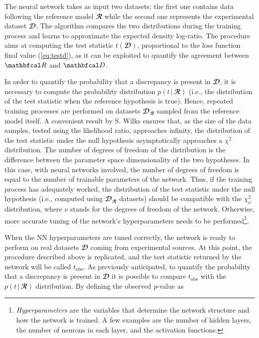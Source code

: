 The neural network takes as input two datasets: the first one contains data following the reference model
$\mathbfcal{R}$ while the second one represents the experimental dataset $\mathbfcal{D}$. The algorithm compares the two
distributions during the training process and learns to approximate the expected density log-ratio. The procedure aims
at computing the test statistic $t(\mathbfcal{D})$, proportional to the loss function final value (\autoref{eq:testd}),
as it can be exploited to quantify the agreement between $\R$ and $\D$. 

\begin{figure}[h]
	\centering
	
	\label{fig:summary}
\end{figure} 

In order to quantify the probability that a discrepancy is present in $\mathbfcal{D}$, it is necessary to compute the
probability distribution $p(t\,|\,\mathbfcal{R})$ (i.e., the distribution of the test statistic when the reference
hypothesis is true). Hence, repeated training processes are performed on datasets $\mathbfcal{D}_{\mathbfcal{R}}$
sampled from the reference model itself. A convenient result by S. Wilks \cite{wilks} ensures that, as the size of the
data samples, tested using the likelihood ratio, approaches infinity, the distribution of the test statistic under the
null hypothesis asymptotically approaches a $\chi^2$ distribution. The number of degrees of freedom of the distribution
is the difference between the parameter space dimensionality of the two hypotheses. In this case, with neural networks
involved, the number of degrees of freedom is equal to the number of trainable parameters of the network. Thus, if the
training process has adequately worked, the distribution of the test statistic under the null hypothesis (i.e., computed
using $\mathbfcal{D}_{\mathbfcal{R}}$ datasets) should be compatible with the $\chi^2_\nu$ distribution, where $\nu$
stands for the degrees of freedom of the network. Otherwise, more accurate tuning of the network's hyperparameters needs
to be performed\footnote{\textit{Hyperparameters} are the variables that determine the network structure and how the
network is trained. A few examples are the number of hidden layers, the number of neurons in each layer, and the
activation functions.}.

When the NN hyperparameters are tuned correctly, the network is ready to perform on real datasets $\mathbfcal{D}$ coming
from experimental sources. At this point, the procedure described above is replicated, and the test statistic returned by
the network will be called $t_{\text{obs}}$. As previously anticipated, to quantify the probability that a discrepancy
is present in $\mathbfcal{D}$ it is possible to compare $t_{\text{obs}}$ with the $p(t\,|\,\mathbfcal{R})$
distribution. By defining the observed \textit{p}-value as 

